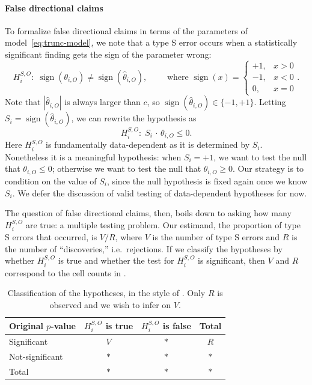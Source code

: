 \documentclass[11pt]{article}
\theoremstyle{definition}
\theoremstyle{custom}
\DeclareMathOperator{\sgn}{sign}
\newcommand{\htheta}{\hat{\theta}}
\begin{document}
  \paragraph{False directional claims} To formalize false directional claims in terms of the parameters of model~\eqref{eq:trunc-model}, we note that a type S error occurs when a statistically significant finding gets the sign of the parameter wrong:
  \[
    H_i^{S,O}:\; \sgn(\theta_{i,O}) \ne \sgn(\htheta_{i,O}), \qquad\text{ where } \sgn(x) =
    \begin{cases}
      +1, & x > 0 \\
      -1, & x < 0 \\
      0, & x = 0
    \end{cases}.
  \]
  Note that $|\htheta_{i,O}|$ is always larger than $c$, so $\sgn(\htheta_{i,O}) \in \{-1,+1\}$. Letting $S_i = \sgn(\htheta_{i,O})$, we can rewrite the hypothesis as
  \[
    H_i^{S,O}:\; S_i\,\cdot\, \theta_{i,O} \le 0.
  \]
  Here $H_i^{S,O}$ is fundamentally data-dependent as it is determined by $S_i$. Nonetheless it is a meaningful hypothesis: when $S_i = +1$, we want to test the null that $\theta_{i,O} \le 0$; otherwise we want to test the null that $\theta_{i,O} \ge 0$. Our strategy is to condition on the value of $S_i$, since the null hypothesis is fixed again once we know $S_i$. We defer the discussion of valid testing of data-dependent hypotheses for now.

  The question of false directional claims, then, boils down to asking how many $H_i^{S,O}$ are true: a multiple testing problem. Our estimand, the proportion of type S errors that occurred, is $V / R$, where $V$ is the number of type S errors and $R$ is the number of ``discoveries,'' i.e.\ rejections. If we classify the hypotheses by whether $H_i^{S,O}$ is true and whether the test for $H_i^{S,O}$ is significant, then $V$ and $R$ correspond to the cell counts in .
  \begin{table}[htbp]
    \centering
    \begin{tabular}{lccc}
      \toprule
      Original $p$-value & $H_i^{S,O}$ is true & $H_i^{S,O}$ is false & Total \\
      \midrule
      Significant & $V$ & $*$ & $R$ \\
      Not-significant & $*$ & $*$ & $*$ \\
      Total & $*$ & $*$ & $*$ \\
      \bottomrule
    \end{tabular}
    \caption{Classification of the hypotheses, in the style of \citet{Benjamini:1995cd}. Only $R$ is observed and we wish to infer on $V$.}
  \label{tbl:err}
  \end{table}
\end{document}
